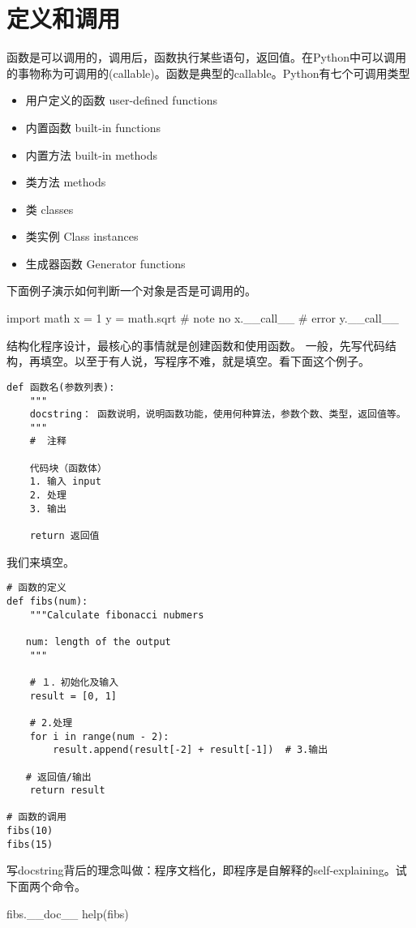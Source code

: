\section{定义和调用}
函数是可以调用的，调用后，函数执行某些语句，返回值。在Python中可以调用的事物称为可调用的(callable)。函数是典型的callable。Python有七个可调用类型
\begin{itemize}
\item 用户定义的函数 user-defined functions
\item 内置函数 built-in functions
\item 内置方法 built-in methods
\item 类方法 methods
\item 类 classes
\item 类实例 Class instances 
\item 生成器函数 Generator functions
\end{itemize}
下面例子演示如何判断一个对象是否是可调用的。
\begin{python}
import math
x  = 1
y = math.sqrt  # note no
x.__call__ # error
y.__call__
\end{python}
结构化程序设计，最核心的事情就是创建函数和使用函数。 一般，先写代码结构，再填空。以至于有人说，写程序不难，就是填空。看下面这个例子。
\begin{framed}
\begin{verbatim}
def 函数名(参数列表):
    """
    docstring： 函数说明，说明函数功能，使用何种算法，参数个数、类型，返回值等。
    """
    #  注释

    代码块（函数体）
    1. 输入 input
    2. 处理
    3. 输出

    return 返回值
\end{verbatim}
\end{framed}
我们来填空。
\begin{framed}
\begin{verbatim}
# 函数的定义
def fibs(num):
    """Calculate fibonacci nubmers

　　num: length of the output
    """

    # １．初始化及输入
    result = [0, 1]

    # 2.处理
    for i in range(num - 2):
        result.append(result[-2] + result[-1])  # 3.输出

　　# 返回值/输出
    return result

# 函数的调用
fibs(10)
fibs(15)
\end{verbatim}
\end{framed}
写docstring背后的理念叫做：程序文档化，即程序是自解释的self-explaining。试下面两个命令。
\begin{python}
fibs.__doc__
help(fibs)
\end{python}
